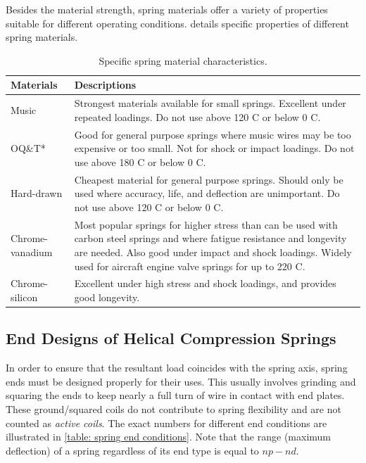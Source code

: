 \documentclass[
10pt,
a4paper,
openany,
svgnames,
]{book}
\begin{document}
Besides the material strength, spring materials offer a variety of properties suitable for different operating conditions.  details specific properties of different spring materials.

\begin{table}[h]
  \centering
  \caption{Specific spring material characteristics.} \label{table: spring material properties}
    \begin{tabular}{ L{3cm} L{10cm}}
      \toprule
      Materials & Descriptions  \\
      \midrule
      Music & Strongest materials available for small springs. Excellent under repeated loadings. Do not use above 120 C or below 0 C. \\
      \midrule
      OQ\&T* & Good for general purpose springs where music wires may be too expensive or too small. Not for shock or impact loadings. Do not use above 180 C or below 0 C. \\
      \midrule
      Hard-drawn & Cheapest material for general purpose springs. Should only be used where accuracy, life, and deflection are unimportant. Do not use above 120 C or below 0 C. \\
      \midrule
      Chrome-vanadium & Most popular springs for higher stress than can be used with carbon steel springs and where fatigue resistance and longevity are needed. Also good under impact and shock loadings. Widely used for aircraft engine valve springs for up to 220 C. \\
      \midrule
      Chrome-silicon & Excellent under high stress and shock loadings, and provides good longevity. \\
      \bottomrule
    \end{tabular}
  \end{table}

\subsection{End Designs of Helical Compression Springs}

In order to ensure that the resultant load coincides with the spring axis, spring ends must be designed properly for their uses. This usually involves grinding and squaring the ends to keep nearly a full turn of wire in contact with end plates. These ground/squared coils do not contribute to spring flexibility and are not counted as \emph{active coils}. The exact numbers for different end conditions are illustrated in \cref{table: spring end conditions}. Note that the range (maximum deflection) of a spring regardless of its end type is equal to $np - nd$.
\end{document}
